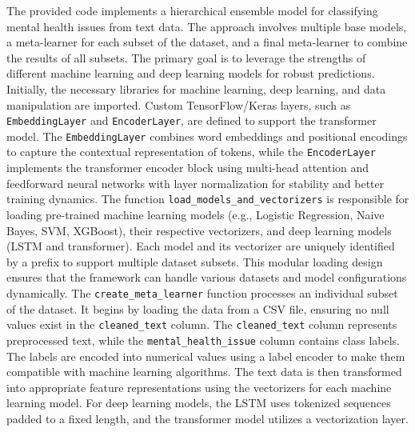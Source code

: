 \noindent
The provided code implements a hierarchical ensemble model for classifying mental health issues from text data. The approach involves multiple base models, a meta-learner for each subset of the dataset, and a final meta-learner to combine the results of all subsets. The primary goal is to leverage the strengths of different machine learning and deep learning models for robust predictions. Initially, the necessary libraries for machine learning, deep learning, and data manipulation are imported. Custom TensorFlow/Keras layers, such as \texttt{EmbeddingLayer} and \texttt{EncoderLayer}, are defined to support the transformer model. The \texttt{EmbeddingLayer} combines word embeddings and positional encodings to capture the contextual representation of tokens, while the \texttt{EncoderLayer} implements the transformer encoder block using multi-head attention and feedforward neural networks with layer normalization for stability and better training dynamics. The function \texttt{load\_models\_and\_vectorizers} is responsible for loading pre-trained machine learning models (e.g., Logistic Regression, Naive Bayes, SVM, XGBoost), their respective vectorizers, and deep learning models (LSTM and transformer). Each model and its vectorizer are uniquely identified by a prefix to support multiple dataset subsets. This modular loading design ensures that the framework can handle various datasets and model configurations dynamically. The \texttt{create\_meta\_learner} function processes an individual subset of the dataset. It begins by loading the data from a CSV file, ensuring no null values exist in the \texttt{cleaned\_text} column. The \texttt{cleaned\_text} column represents preprocessed text, while the \texttt{mental\_health\_issue} column contains class labels. The labels are encoded into numerical values using a label encoder to make them compatible with machine learning algorithms. The text data is then transformed into appropriate feature representations using the vectorizers for each machine learning model. For deep learning models, the LSTM uses tokenized sequences padded to a fixed length, and the transformer model utilizes a vectorization layer.

\vspace{1em}

